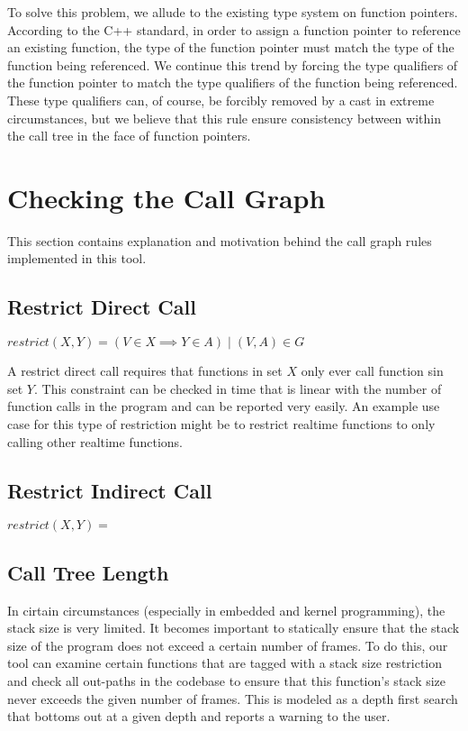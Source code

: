 To solve this problem, we allude to the existing type system on function pointers.  According to the C++ standard, in order to assign a function pointer to reference an existing function, the type of the function pointer must match the type of the function being referenced.  We continue this trend by forcing the type qualifiers of the function pointer to match the type qualifiers of the function being referenced.  These type qualifiers can, of course, be forcibly removed by a cast in extreme circumstances, but we believe that this rule ensure consistency between within the call tree in the face of function pointers.

\section{Checking the Call Graph}

This section contains explanation and motivation behind the call graph rules implemented in this tool.

\subsection{Restrict Direct Call}

\begin{center}
    $restrict(X, Y) = ( V \in X \implies Y \in A ) \mid (V, A) \in G$
\end{center}

A restrict direct call requires that functions in set $X$ only ever call function sin set $Y$.  This constraint can be checked in time that is linear with the number of function calls in the program and can be reported very easily.  An example use case for this type of restriction might be to restrict realtime functions to only calling other realtime functions.

\subsection{Restrict Indirect Call}

\begin{center}
    $restrict(X, Y) = $
\end{center}

\subsection{Call Tree Length}

In cirtain circumstances (especially in embedded and kernel programming), the stack size is very limited.  It becomes important to statically ensure that the stack size of the program does not exceed a certain number of frames.  To do this, our tool can examine certain functions that are tagged with a stack size restriction and check all out-paths in the codebase to ensure that this function's stack size never exceeds the given number of frames.  This is modeled as a depth first search that bottoms out at a given depth and reports a warning to the user.
